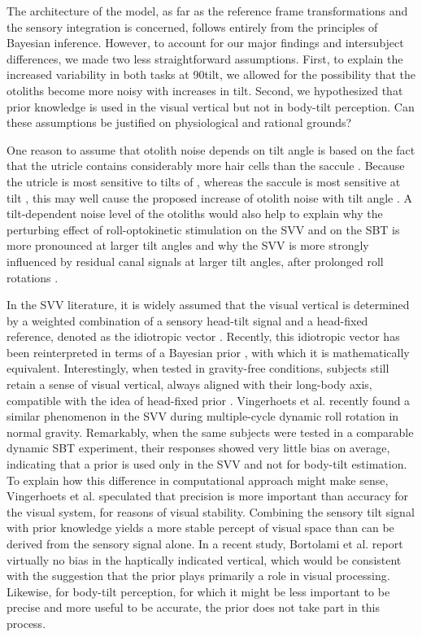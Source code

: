 The architecture of the model, as far as the reference frame transformations and the sensory integration is concerned, follows entirely from the principles of Bayesian inference. However, to account for our major findings and intersubject differences, we made two less straightforward assumptions. First, to explain the increased variability in both tasks at 90\mydegree tilt, we allowed for the possibility that the otoliths become more noisy with increases in tilt. Second, we hypothesized that prior knowledge is used in the visual vertical but not in body-tilt perception. Can these assumptions be justified on physiological and rational grounds? 

One reason to assume that otolith noise depends on tilt angle is based on the fact that the utricle contains considerably more hair cells than the saccule \cite{rosenhall1972, rosenhall1974}. Because the utricle is most sensitive to tilts of \textdegree, whereas the saccule is most sensitive at \mydegree tilt \cite{jaeger2008}, this may well cause the proposed increase of otolith noise with tilt angle \cite{tarnutzer2010}. A tilt-dependent noise level of the otoliths would also help to explain why the perturbing effect of roll-optokinetic stimulation on the SVV \cite{dichgans1974, fernandez1976} and on the SBT \cite{young1975} is more pronounced at larger tilt angles and why the SVV is more strongly influenced by residual canal signals at larger tilt angles, after prolonged roll rotations \cite{lorincz2008}.

In the SVV literature, it is widely assumed that the visual vertical is determined by a weighted combination of a sensory head-tilt signal and a head-fixed reference, denoted as the idiotropic vector \cite{mittelstaedt1983}. Recently, this idiotropic vector has been reinterpreted in terms of a Bayesian prior \cite{eggert1998, macneilage2007, devrijer2008}, with which it is mathematically equivalent. Interestingly, when tested in gravity-free conditions, subjects still retain a sense of visual vertical, always aligned with their long-body axis, compatible with the idea of head-fixed prior \cite{mittelstaedt1983}. Vingerhoets et al. \citeyear{vingerhoets2008} recently found a similar phenomenon in the SVV during multiple-cycle dynamic roll rotation in normal gravity. Remarkably, when the same subjects were tested in a comparable dynamic SBT experiment, their responses showed very little bias on average, indicating that a prior is used only in the SVV and not for body-tilt estimation. To explain how this difference in computational approach might make sense, Vingerhoets et al. \citeyear{vingerhoets2008} speculated that precision is more important than accuracy for the visual system, for reasons of visual stability. Combining the sensory tilt signal with prior knowledge yields a more stable percept of visual space than can be derived from the sensory signal alone. In a recent study, Bortolami et al. \citeyear{bortolami2006} report virtually no bias in the haptically indicated vertical, which would be consistent with the suggestion that the prior plays primarily a role in visual processing. Likewise, for body-tilt perception, for which it might be less important to be precise and more useful to be accurate, the prior does not take part in this process. 


